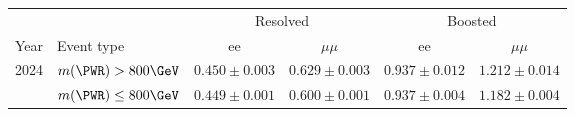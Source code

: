 \begin{tabular}{llcccc}
\hline
 & & \multicolumn{2}{c}{Resolved} & \multicolumn{2}{c}{Boosted} \\
Year & Event type & ee & $\mu\mu$ & ee & $\mu\mu$ \\
\hline
2024 & $m(\PWR) > 800\GeV$ & $0.450 \pm 0.003$ & $0.629 \pm 0.003$ & $0.937 \pm 0.012$ & $1.212 \pm 0.014$ \\
 & $m(\PWR) \leq 800\GeV$ & $0.449 \pm 0.001$ & $0.600 \pm 0.001$ & $0.937 \pm 0.004$ & $1.182 \pm 0.004$ \\
\hline
\end{tabular}
